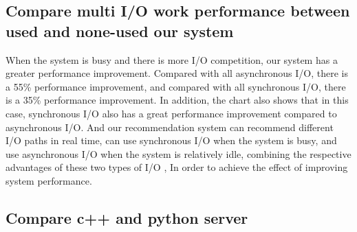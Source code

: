 \documentclass[conference]{IEEEtran}
\begin{document}
\subsection{Compare multi I/O work performance between used and none-used our system}

\datatable



  When the system is busy and there is more I/O competition, our system has a greater performance improvement. Compared with all asynchronous I/O, there is a 55\% performance improvement, and compared with all synchronous I/O, there is a 35\% performance improvement. In addition, the chart also shows that in this case, synchronous I/O also has a great performance improvement compared to asynchronous I/O.
And our recommendation system can recommend different I/O paths in real time, can use synchronous I/O when the system is busy, and use asynchronous I/O when the system is relatively idle, combining the respective advantages of these two types of I/O , In order to achieve the effect of improving system performance.

\subsection{Compare c++ and python server
}

\datatable


\end{document}
